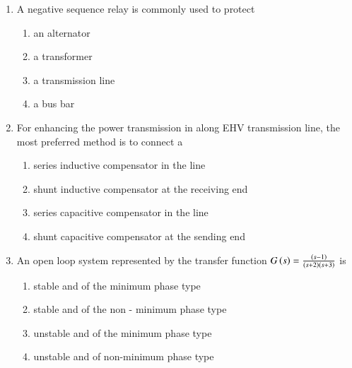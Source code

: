 \documentclass[journal]{IEEEtran}
\begin{document}
\begin{enumerate}
\begin{enumerate}
%
\end{enumerate}
\item A negative sequence relay is commonly used to protect 
\begin{enumerate}
    \item an alternator
    \item a transformer
    \item a transmission line
    \item a bus bar \\
\end{enumerate}
\item For enhancing the power transmission in along EHV transmission line, the most preferred method is to connect a 
\begin{enumerate}
    \item series inductive compensator in the line
    \item shunt inductive compensator at the receiving end 
    \item series capacitive compensator in the line
    \item shunt capacitive compensator at the sending end \\
\end{enumerate}
\item An open loop system represented by the transfer function $G\left(s\right) = \frac{\left(s-1\right)}{\left(s+2\right)\left(s+3\right)}$ is
 \begin{enumerate}
    \item stable and of the minimum phase type
    \item stable and of the non - minimum phase type 
    \item unstable and of the minimum phase type 
    \item unstable and of non-minimum phase type  \\

\end{enumerate}
\end{enumerate}
\end{document}
